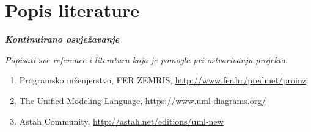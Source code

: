 \chapter*{Popis literature}

\textbf{\textit{Kontinuirano osvježavanje}}

\textit{Popisati sve reference i literaturu koja je pomogla pri ostvarivanju projekta.}


\begin{enumerate}
	
	
	\item  Programsko inženjerstvo, FER ZEMRIS, \url{http://www.fer.hr/predmet/proinz}
	
	\item  The Unified Modeling Language, \url{https://www.uml-diagrams.org/}
	
	\item  Astah Community, \url{http://astah.net/editions/uml-new}
\end{enumerate}